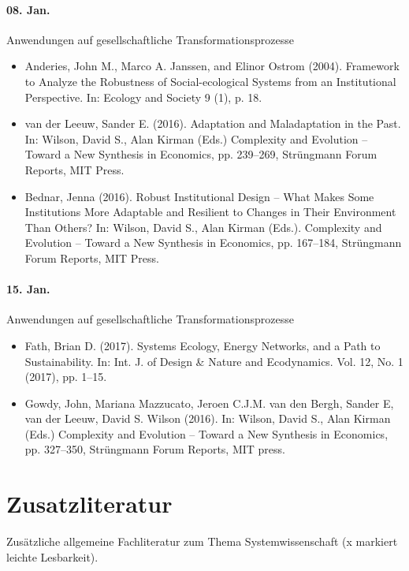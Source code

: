 \documentclass[11pt,a4paper]{article}
\begin{document}
\paragraph{08. Jan.}
Anwendungen auf gesellschaftliche Transformationsprozesse
\begin{itemize}
\item Anderies, John M., Marco A. Janssen, and Elinor Ostrom (2004).
  Framework to Analyze the Robustness of Social-ecological Systems from an
  Institutional Perspective. In: Ecology and Society 9 (1), p. 18.
\item van der Leeuw, Sander E. (2016). Adaptation and Maladaptation in the
  Past. In: Wilson, David S., Alan Kirman (Eds.) Complexity and Evolution --
  Toward a New Synthesis in Economics, pp. 239--269, Strüngmann Forum Reports,
  MIT Press.
\item Bednar, Jenna (2016). Robust Institutional Design – What Makes Some
  Institutions More Adaptable and Resilient to Changes in Their Environment
  Than Others? In: Wilson, David S., Alan Kirman (Eds.).  Complexity and
  Evolution -- Toward a New Synthesis in Economics, pp. 167--184, Strüngmann
  Forum Reports, MIT Press.
\end{itemize}
  
\paragraph{15. Jan.}
Anwendungen auf gesellschaftliche Transformationsprozesse
\begin{itemize}
\item Fath, Brian D. (2017). Systems Ecology, Energy Networks, and a Path to
  Sustainability. In: Int. J. of Design \& Nature and Ecodynamics. Vol. 12,
  No. 1 (2017), pp. 1–15. 
\item Gowdy, John, Mariana Mazzucato, Jeroen C.J.M. van den Bergh, Sander E,
  van der Leeuw, David S. Wilson (2016). In: Wilson, David S., Alan Kirman
  (Eds.) Complexity and Evolution -- Toward a New Synthesis in Economics,
  pp. 327--350, Strüngmann Forum Reports, MIT press.
\end{itemize}

\section{Zusatzliteratur}

Zusätzliche allgemeine Fachliteratur zum Thema Systemwissenschaft (x markiert
leichte Lesbarkeit).
\end{document}
